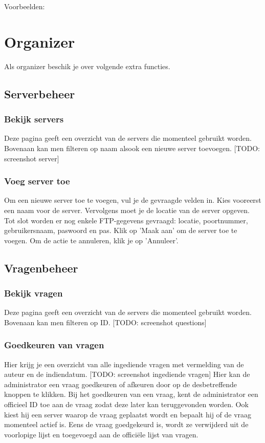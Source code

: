 \documentclass[]{article}
\begin{document}
Voorbeelden:

 

\section{Organizer}

Als organizer beschik je over volgende extra functies.

\subsection{Serverbeheer}

\subsubsection{Bekijk servers}
Deze pagina geeft een overzicht van de servers die momenteel gebruikt worden. Bovenaan kan men filteren op naam alsook een nieuwe server toevoegen. [TODO: screenshot server]

\subsubsection{Voeg server toe}
Om een nieuwe server toe te voegen, vul je de gevraagde velden in. Kies vooreerst een naam voor de server. Vervolgens moet je de locatie van de server opgeven. Tot slot worden er nog enkele FTP-gegevens gevraagd: locatie, poortnummer, gebruikersnaam, paswoord en pas. Klik op 'Maak aan' om de server toe te voegen. Om de actie te annuleren, klik je op 'Annuleer'.

\subsection{Vragenbeheer}

\subsubsection{Bekijk vragen}
Deze pagina geeft een overzicht van de servers die momenteel gebruikt worden. Bovenaan kan men filteren op ID. [TODO: screenshot questions]

\subsubsection{Goedkeuren van vragen}
Hier krijg je een overzicht van alle ingediende vragen met vermelding van de auteur en de indiendatum. [TODO: screenshot ingediende vragen] Hier kan de administrator een vraag goedkeuren of afkeuren door op de desbetreffende knoppen te klikken. Bij het goedkeuren van een vraag, kent de administrator een officieel ID toe aan de vraag zodat deze later kan teruggevonden worden. Ook kiest hij een server waarop de vraag geplaatst wordt en bepaalt hij of de vraag momenteel actief is. Eens de vraag goedgekeurd is, wordt ze verwijderd uit de voorlopige lijst en toegevoegd aan de officiële lijst van vragen.
\end{document}
